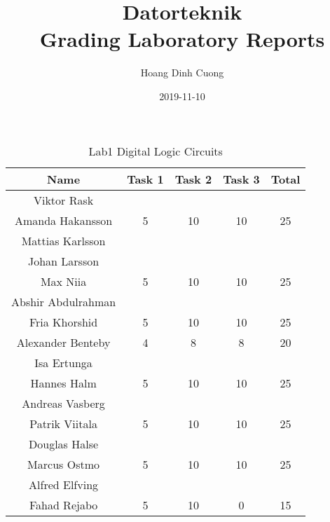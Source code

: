 \documentclass{article}
\title{Datorteknik \\ Grading Laboratory Reports}
\date{2019-11-10}
\author{Hoang Dinh Cuong}
\begin{document}
\maketitle
\newpage
{}



\begin{table}[ht]
\caption{Lab1 Digital Logic Circuits}
\centering 
\begin{tabular}{c c c c c} 
\hline\hline 
Name & Task 1 & Task 2 & Task 3 & Total \\ [0.5ex] 
\hline
Viktor Rask \\ Amanda Hakansson 
& 5 & 10 & 10 & 25 \\
\hline 
Mattias Karlsson \\ Johan Larsson \\ Max Niia 
& 5 & 10 & 10 & 25 \\
\hline 
Abshir Abdulrahman \\ Fria Khorshid 
& 5 & 10 & 10 & 25 \\
\hline 
Alexander Benteby 
& 4 & 8 & 8 & 20 \\
\hline 
Isa Ertunga \\ Hannes Halm 
& 5 & 10 & 10 & 25 \\
\hline
Andreas Vasberg \\ Patrik Viitala
& 5 & 10 & 10 & 25 \\ 
\hline
Douglas Halse \\ Marcus Ostmo
& 5 & 10 & 10 & 25 \\ 
\hline
Alfred Elfving \\ Fahad Rejabo
& 5 & 10 & 0 & 15 \\
\hline
\end{tabular}
\label{table:nonlin}
\end{table}

\end{document}

